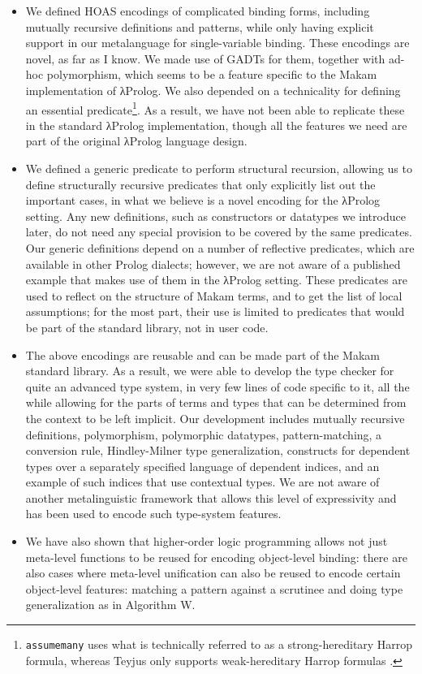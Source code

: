 \begin{itemize}
\item
  We defined HOAS encodings of complicated binding forms, including
  mutually recursive definitions and patterns, while only having
  explicit support in our metalanguage for single-variable binding.
  These encodings are novel, as far as I know. We made use of GADTs for
  them, together with ad-hoc polymorphism, which seems to be a feature
  specific to the Makam implementation of \foreignlanguage{greek}{λ}Prolog. We also depended on a
  technicality for defining an essential
  predicate\footnote{\texttt{assumemany} uses what is technically referred to
    as a strong-hereditary Harrop formula, whereas Teyjus only supports weak-hereditary
    Harrop formulas \citep{nadathur1999system}.}. As a result, we have
  not been able to replicate these in the standard \foreignlanguage{greek}{λ}Prolog
  implementation, though all the features we need are part of the
  original \foreignlanguage{greek}{λ}Prolog language design.
\item
  We defined a generic predicate to perform structural recursion,
  allowing us to define structurally recursive predicates that only
  explicitly list out the important cases, in what we believe is a novel
  encoding for the \foreignlanguage{greek}{λ}Prolog setting. Any new definitions, such as
  constructors or datatypes we introduce later, do not need any special
  provision to be covered by the same predicates. Our generic
  definitions depend on a number of reflective predicates, which are
  available in other Prolog dialects; however, we are not aware of a
  published example that makes use of them in the \foreignlanguage{greek}{λ}Prolog setting. These
  predicates are used to reflect on the structure of Makam terms, and to
  get the list of local assumptions; for the most part, their use is
  limited to predicates that would be part of the standard library, not
  in user code.
\item
  The above encodings are reusable and can be made part of the Makam
  standard library. As a result, we were able to develop the type
  checker for quite an advanced type system, in very few lines of code
  specific to it, all the while allowing for the parts of terms and
  types that can be determined from the context to be left implicit. Our
  development includes mutually recursive definitions, polymorphism,
  polymorphic datatypes, pattern-matching, a conversion rule,
  Hindley-Milner type generalization, constructs for dependent types
  over a separately specified language of dependent indices, and an
  example of such indices that use contextual types. We are not aware of
  another metalinguistic framework that allows this level of
  expressivity and has been used to encode such type-system features.
\item
  We have also shown that higher-order logic programming allows not just
  meta-level functions to be reused for encoding object-level binding:
  there are also cases where meta-level unification can also be reused
  to encode certain object-level features: matching a pattern against a
  scrutinee and doing type generalization as in Algorithm W.
\end{itemize}

